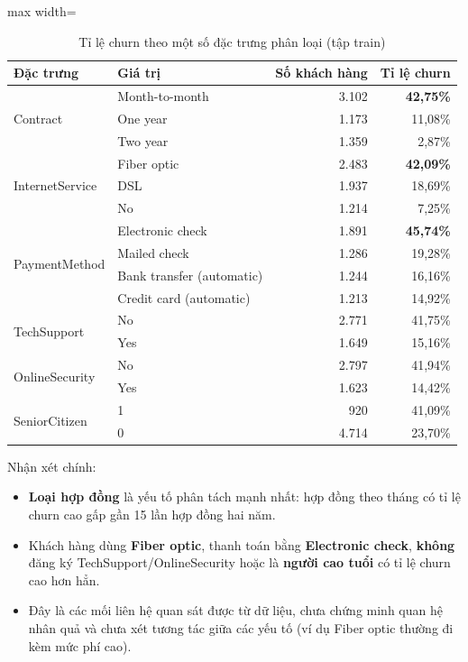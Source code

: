 \begin{table}[H]
\centering
\begin{adjustbox}{max width=\textwidth}
\begin{tabular}{|l|l|r|r|}
\hline
\textbf{Đặc trưng} & \textbf{Giá trị} & \textbf{Số khách hàng} & \textbf{Tỉ lệ churn} \\
\hline
\multirow{3}{*}{Contract} & Month-to-month & 3.102 & \textbf{42,75\%} \\
\cline{2-4}
 & One year & 1.173 & 11,08\% \\
\cline{2-4}
 & Two year & 1.359 & 2,87\% \\
\hline
\multirow{3}{*}{InternetService} & Fiber optic & 2.483 & \textbf{42,09\%} \\
\cline{2-4}
 & DSL & 1.937 & 18,69\% \\
\cline{2-4}
 & No & 1.214 & 7,25\% \\
\hline
\multirow{4}{*}{PaymentMethod} & Electronic check & 1.891 & \textbf{45,74\%} \\
\cline{2-4}
 & Mailed check & 1.286 & 19,28\% \\
\cline{2-4}
 & Bank transfer (automatic) & 1.244 & 16,16\% \\
\cline{2-4}
 & Credit card (automatic) & 1.213 & 14,92\% \\
\hline
\multirow{2}{*}{TechSupport} & No & 2.771 & 41,75\% \\
\cline{2-4}
 & Yes & 1.649 & 15,16\% \\
\hline
\multirow{2}{*}{OnlineSecurity} & No & 2.797 & 41,94\% \\
\cline{2-4}
 & Yes & 1.623 & 14,42\% \\
\hline
\multirow{2}{*}{SeniorCitizen} & 1 & 920 & 41,09\% \\
\cline{2-4}
 & 0 & 4.714 & 23,70\% \\
\hline
\end{tabular}
\end{adjustbox}
\caption{Tỉ lệ churn theo một số đặc trưng phân loại (tập train)}
\end{table}

Nhận xét chính:
\begin{itemize}
    \item \textbf{Loại hợp đồng} là yếu tố phân tách mạnh nhất: hợp đồng theo tháng có tỉ lệ churn cao gấp gần 15 lần hợp đồng hai năm.
    \item Khách hàng dùng \textbf{Fiber optic}, thanh toán bằng \textbf{Electronic check}, \textbf{không} đăng ký TechSupport/OnlineSecurity hoặc là \textbf{người cao tuổi} có tỉ lệ churn cao hơn hẳn.
    \item Đây là các mối liên hệ quan sát được từ dữ liệu, chưa chứng minh quan hệ nhân quả và chưa xét tương tác giữa các yếu tố (ví dụ Fiber optic thường đi kèm mức phí cao).
\end{itemize}

